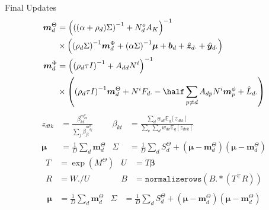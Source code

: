 \documentclass[xcolor=dvipsnames]{beamer}
\newcommand \vv[1]   { { \boldsymbol{#1} } }
\newcommand \T       { { ^\top } }
\newcommand \ex[2]   { { \mathbb{E}_{{#1}}\left[ #2 \right] } }
\newcommand \mtd { { \boldsymbol{m}_d^{\Theta} } }
\newcommand \std { { S_d^{\Theta}              } }
\newcommand \mpd { { \boldsymbol{m}_d^{\Phi}   } }
\newcommand \invb[1]  { { \left( #1 \right)^{-1}     } }
\begin{document}
\begin{frame}{Final Updates}
\small
\begin{align*}
\mtd &= \invb{ \invb{(\alpha + \rho_d)\Sigma} + N^o_d A_K } \\
    & \times
            \left(
                \invb{\rho_d \Sigma} \mpd
                + \invb{\alpha \Sigma}\vv{\mu}
                + \vv{b}_d 
                + \hat{\vv{z}}_{d\cdot}
                + \hat{\vv{y}}_{d\cdot}
            \right) \\
 \mpd & = \invb{\invb{\rho_d \tau I} + A_{dd}N^i} \\
  & \times
             \left(
                 \invb{\rho_d \tau I}\mtd + N^i F_{d\cdot} -\half \sum_{p \neq d} A_{dp} N^i \vv{m}^\phi_p + \hat{L}_{d\cdot}
             \right)
\end{align*}
 {
     \begin{align*}
     z_{dtk}    & = \frac{\beta_{kt}^{m^\theta_{dk}}}{\sum_j \beta_{jt}^{m^\theta_{dj}}} &
     \beta_{kt} & = \frac{\sum_d w_{dt}\ex{q}{z_{dtk}}}{\sum_v \sum_d w_{dv}\ex{q}{z_{dvk}}} \\
     \vv{\mu} & = \frac{1}{D}\sum_d \mtd &
     \Sigma   & = \frac{1}{D}\sum_d \std + (\vv{\mu} - \mtd)(\vv{\mu} - \mtd)
     \end{align*}
}
 {
    \begin{align*}
    T & = \exp(M^{\Theta}) &
    U & = T \vv{\beta} \\
    R & = W ./ U &
    B & = \texttt{normalizerows}(B .* (T\T R))\\
    \end{align*}
    \begin{align*}
    \vv{\mu} & = \frac{1}{D}\sum_d \mtd &
    \Sigma   & = \frac{1}{D}\sum_d \std + (\vv{\mu} - \mtd)(\vv{\mu} - \mtd)
    \end{align*}
}
\normalsize

\end{frame}


\end{document}
